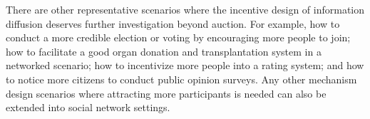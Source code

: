 \documentclass{article}
\begin{document}
There are other representative scenarios where the incentive design of information diffusion deserves further investigation beyond auction. For example, how to conduct a more credible election or voting \cite{ColleyEtAlIJCAI2020} by encouraging more people to join; how to facilitate a good organ donation \cite{roth2004kidney,roth2005pairwise} and transplantation system in a networked scenario; how to incentivize more people into a rating system; and how to notice more citizens to conduct public opinion surveys. Any other mechanism design scenarios where attracting more participants is needed can also be extended into social network settings.




\end{document}
